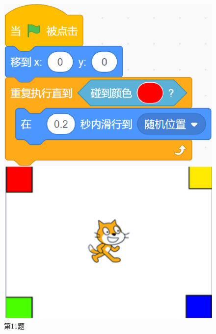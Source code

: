 \documentclass[10pt, a4paper]{article}
\begin{document}
\begin{enumerate}
\begin{figure}[htbp]
\begin{minipage}[t]{.16\textwidth}
                \includegraphics[width=\textwidth]{11.png}
                \caption*{第11题}
            \end{minipage}
            \begin{minipage}[t]{.07\textwidth}
                \centering

\end{minipage}
\end{figure}
\end{enumerate}
\end{document}
